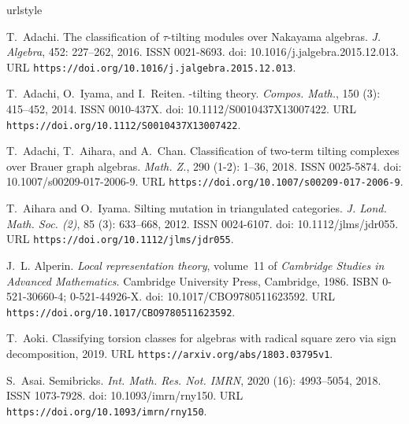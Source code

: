 \documentclass[pdftex,a4paper]{article}
\numberwithin{equation}{subsection}
\theoremstyle{definition}
\begin{document}
\begin{thebibliography}{23}
	\providecommand{\natexlab}[1]{#1}
	\providecommand{\url}[1]{\texttt{#1}}
	\expandafter\ifx\csname urlstyle\endcsname\relax
		\providecommand{\doi}[1]{doi: #1}\else
		\providecommand{\doi}{doi: \begingroup \urlstyle{rm}\Url}\fi

	T.~Adachi.
	\newblock The classification of {$\tau$}-tilting modules over {N}akayama
	algebras.
	\newblock \emph{J. Algebra}, 452: 227--262, 2016.
	\newblock ISSN 0021-8693.
	\newblock \doi{10.1016/j.jalgebra.2015.12.013}.
	\newblock URL \url{https://doi.org/10.1016/j.jalgebra.2015.12.013}.

	T.~Adachi, O.~Iyama, and I.~Reiten.
	\newblock {$\tau$}-tilting theory.
	\newblock \emph{Compos. Math.}, 150 (3): 415--452, 2014.
	\newblock ISSN 0010-437X.
	\newblock \doi{10.1112/S0010437X13007422}.
	\newblock URL \url{https://doi.org/10.1112/S0010437X13007422}.

	T.~Adachi, T.~Aihara, and A.~Chan.
	\newblock Classification of two-term tilting complexes over {B}rauer graph
	algebras.
	\newblock \emph{Math. Z.}, 290 (1-2): 1--36, 2018.
	\newblock ISSN 0025-5874.
	\newblock \doi{10.1007/s00209-017-2006-9}.
	\newblock URL \url{https://doi.org/10.1007/s00209-017-2006-9}.

	T.~Aihara and O.~Iyama.
	\newblock Silting mutation in triangulated categories.
	\newblock \emph{J. Lond. Math. Soc. (2)}, 85 (3): 633--668,
	2012.
	\newblock ISSN 0024-6107.
	\newblock \doi{10.1112/jlms/jdr055}.
	\newblock URL \url{https://doi.org/10.1112/jlms/jdr055}.

	J.~L. Alperin.
	\newblock \emph{Local representation theory}, volume~11 of \emph{Cambridge
		Studies in Advanced Mathematics}.
	\newblock Cambridge University Press, Cambridge, 1986.
	\newblock ISBN 0-521-30660-4; 0-521-44926-X.
	\newblock \doi{10.1017/CBO9780511623592}.
	\newblock URL \url{https://doi.org/10.1017/CBO9780511623592}.

	T.~Aoki.
	\newblock Classifying torsion classes for algebras with radical square zero via
	sign decomposition, 2019.
	\newblock URL \url{https://arxiv.org/abs/1803.03795v1}.

	S.~Asai.
	\newblock Semibricks.
	\newblock \emph{Int. Math. Res. Not. IMRN}, 2020 (16):
	4993--5054, 2018.
	\newblock ISSN 1073-7928.
	\newblock \doi{10.1093/imrn/rny150}.
	\newblock URL \url{https://doi.org/10.1093/imrn/rny150}.


\end{thebibliography}
\end{document}
